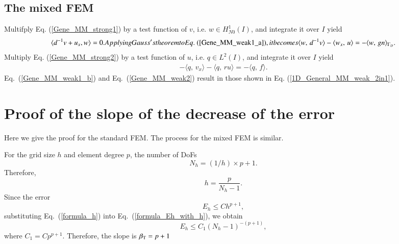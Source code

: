 \documentclass[review,3p]{elsarticle}
\begin{document}
\subsection{The mixed FEM}		\label{derivation_weak_form_MM}
Multifply Eq. (\ref{Gene_MM_strong1}) by a test function of $v$, i.e. $w \in H _{N0}^{1}(I)$, and integrate it over $I$ yield
\begin{subequations}
\begin{align}
  \langle d^{-1}v + u _x, w \rangle = 0.	\label{Gene_MM_weak1_a}
\end{align}
Applying Gauss's theorem to Eq.~(\ref{Gene_MM_weak1_a}), it becomes
\begin{align}
 \langle w, \, d^{-1}v \rangle - \langle w_x, \,  u \rangle = -\langle w, \, g n\rangle_{\Gamma_D}.		\label{Gene_MM_weak1_b}
\end{align}				\label{Gene_MM_weak1}%
\end{subequations}
Multiply Eq. (\ref{Gene_MM_strong2}) by a test function of $u$, i.e. $q \in L^2 (I)$, and integrate it over $I$ yield
\begin{align}
- \langle q , \, v_x \rangle - \langle q, \, ru \rangle = - \langle q, \, f \rangle. \label{Gene_MM_weak2}
\end{align}
Eq.~(\ref{Gene_MM_weak1_b}) and Eq.~({\ref{Gene_MM_weak2}}) result in those shown in Eq. (\ref{1D_General_MM_weak_2in1}).

\section{Proof of the slope of the decrease of the error}				\label{proof_slope_ET}

Here we give the proof for the standard FEM. The process for the mixed FEM is similar. 

For the grid size $h$ and element degree $p$, the number of DoFs
\begin{equation}
N_h=(1/h) \times p+1.			\label{formula_Nh}
\end{equation}
Therefore,
\begin{equation}
h=\frac{p}{N_h-1}.		\label{formula_h}
\end{equation}
Since the error \cite{gockenbach2006understanding}
\begin{equation}
E_h \leqslant Ch^{p+1},			\label{formula_Eh_with_h}
\end{equation}
substituting Eq.~(\ref{formula_h}) into Eq.~(\ref{formula_Eh_with_h}), we obtain
\begin{equation}
E_h \leqslant C_1(N_h-1)^{-(p+1)},			\label{formula_Eh_with_Nh}
\end{equation}
where $C_1=C p^{p+1}$. Therefore, the slope is $\beta_{\rm T}=p+1$

  

\end{document}
